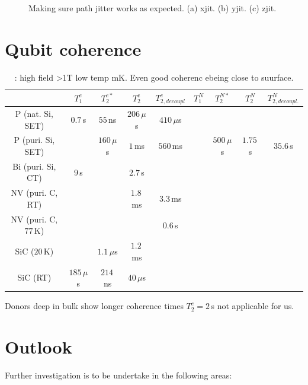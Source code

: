 \begin{figure}[H]
\begin{subfigure}[t]{0.49\textwidth}
		\caption{}
		\label{fig:zjit}
	\end{subfigure}
	\label{fig:paritymeas}
	\caption{Making sure path jitter works as expected. (a) xjit. (b) yjit. (c) zjit.}
\end{figure}



\section{Qubit coherence}

\begin{table}
\begin{tabular}{ccccccccc}
	& $T_1^e$ & $T_2^{e*}$ & $T_2^e$ & $T_{2, decoupl}^e$ & $T_1^N$ & $T_2^{N*}$ & $T_2^N$ & $T_{2, decoupl.}^N$\\ \hline
P (nat. Si, SET) \cite{Pla2012}& $0.7\, $s & $55\, $ns  & $206\, \mu$s & $410\, \mu$s &  & & \\
P (puri. Si, SET) \cite{Muhonen2014}&  & $160\, \mu$s  & $1\, $ms & $560\, $ms & & $500\, \mu$s & $1.75\, $s & $35.6\, $s \\
Bi (puri. Si, CT) \cite{Wolfowicz2013} & $9\, $s &  & $2.7\, $s && && &\\
NV (puri. C, RT) \cite{Balasubramanian2009,Bar-Gill2013} & & & $1.8\, $ms & $3.3\, $ms && &&\\
NV (puri. C, $77\, $K) \cite{Bar-Gill2013} & & &  & $0.6\, $s && &&\\
SiC ($20\, $K) \cite{Christle2014} & & $1.1\, \mu$s & $1.2\, $ms & && && \\
SiC (RT) \cite{Koehl2011} & $185\, \mu$s & $214\, $ns & $40\, \mu$s &  & & && \\
\hline
\end{tabular} 
\label{lala}
\caption{\cite{Pla2012,Muhonen2014}: high field >1T low temp mK. Even good coherenc ebeing close to suurface.}
\end{table}

Donors deep in bulk show longer coherence times $T_2^e=2\, $s \cite{Tyryshkin2011} not applicable for us.


\section{Outlook}
Further investigation is to be undertake in the following areas:

